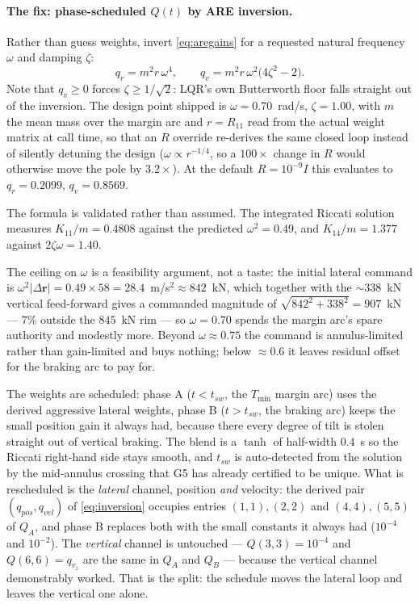 \documentclass[11pt]{article}
\newcommand{\rvec}{\mathbf{r}}
\newcommand{\Tmin}{T_{\min}}
\begin{document}
\paragraph{The fix: phase-scheduled $Q(t)$ by ARE inversion.}
Rather than guess weights, invert \eqref{eq:aregains} for a requested
natural frequency $\omega$ and damping $\zeta$:
%
\begin{equation}
q_r = m^2 r\, \omega^4,
\qquad
q_v = m^2 r\, \omega^2 \big(4\zeta^2 - 2\big).
\label{eq:inversion}
\end{equation}
%
Note that $q_v \ge 0$ forces $\zeta \ge 1/\sqrt{2}$: LQR's own Butterworth
floor falls straight out of the inversion. The design point shipped is
$\omega = 0.70$~rad/s, $\zeta = 1.00$, with $m$ the mean mass over the
margin arc and $r = R_{11}$ read from the actual weight matrix at call time,
so that an $R$ override re-derives the same closed loop instead of silently
detuning the design ($\omega \propto r^{-1/4}$, so a $100\times$ change in
$R$ would otherwise move the pole by $3.2\times$). At the default $R =
10^{-9}I$ this evaluates to $q_r = 0.2099$, $q_v = 0.8569$.

The formula is validated rather than assumed. The integrated Riccati
solution measures $K_{11}/m = 0.4808$ against the predicted
$\omega^2 = 0.49$, and $K_{14}/m = 1.377$ against $2\zeta\omega = 1.40$.

The ceiling on $\omega$ is a feasibility argument, not a taste: the initial
lateral command is $\omega^2 |\Delta \rvec| = 0.49 \times 58 = 28.4$~m/s$^2
\approx 842$~kN, which together with the $\sim 338$~kN vertical feed-forward
gives a commanded magnitude of $\sqrt{842^2 + 338^2} = 907$~kN --- $7\%$
outside the $845$~kN rim --- so $\omega = 0.70$ spends the margin
arc's spare authority and modestly more. Beyond $\omega \approx 0.75$ the
command is annulus-limited rather than gain-limited and buys nothing; below
$\approx 0.6$ it leaves residual offset for the braking arc to pay for.

The weights are scheduled: phase A ($t < t_{sw}$, the $\Tmin$ margin arc)
uses the derived aggressive lateral weights, phase B ($t > t_{sw}$, the
braking arc) keeps the small position gain it always had, because there
every degree of tilt is stolen straight out of vertical braking. The blend
is a $\tanh$ of half-width $0.4$~s so the Riccati right-hand side stays
smooth, and $t_{sw}$ is auto-detected from the solution by the mid-annulus
crossing that G5 has already certified to be unique. What is rescheduled is
the \emph{lateral} channel, position \emph{and} velocity: the derived pair
$(q_{pos}, q_{vel})$ of \eqref{eq:inversion} occupies entries $(1,1),(2,2)$
and $(4,4),(5,5)$ of $Q_A$, and phase B replaces both with the small
constants it always had ($10^{-4}$ and $10^{-2}$). The \emph{vertical}
channel is untouched --- $Q(3,3) = 10^{-4}$ and $Q(6,6) = q_{v_z}$ are the
same in $Q_A$ and $Q_B$ --- because the vertical channel demonstrably
worked. That is the split: the schedule moves the lateral loop and leaves
the vertical one alone.
\end{document}
